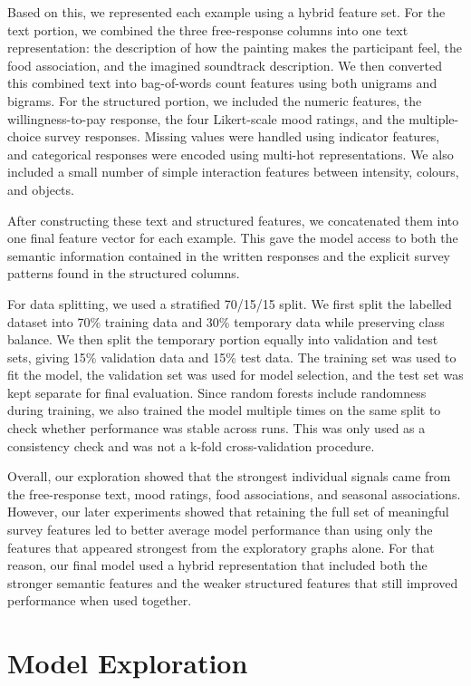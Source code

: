 \documentclass[12pt]{article}
\begin{document}
Based on this, we represented each example using a hybrid feature set. For the text portion, we combined the three free-response columns into one text representation: the description of how the painting makes the participant feel, the food association, and the imagined soundtrack description. We then converted this combined text into bag-of-words count features using both unigrams and bigrams. For the structured portion, we included the numeric features, the willingness-to-pay response, the four Likert-scale mood ratings, and the multiple-choice survey responses. Missing values were handled using indicator features, and categorical responses were encoded using multi-hot representations. We also included a small number of simple interaction features between intensity, colours, and objects.

After constructing these text and structured features, we concatenated them into one final feature vector for each example. This gave the model access to both the semantic information contained in the written responses and the explicit survey patterns found in the structured columns.

For data splitting, we used a stratified 70/15/15 split. We first split the labelled dataset into 70\% training data and 30\% temporary data while preserving class balance. We then split the temporary portion equally into validation and test sets, giving 15\% validation data and 15\% test data. The training set was used to fit the model, the validation set was used for model selection, and the test set was kept separate for final evaluation. Since random forests include randomness during training, we also trained the model multiple times on the same split to check whether performance was stable across runs. This was only used as a consistency check and was not a k-fold cross-validation procedure.

Overall, our exploration showed that the strongest individual signals came from the free-response text, mood ratings, food associations, and seasonal associations. However, our later experiments showed that retaining the full set of meaningful survey features led to better average model performance than using only the features that appeared strongest from the exploratory graphs alone. For that reason, our final model used a hybrid representation that included both the stronger semantic features and the weaker structured features that still improved performance when used together.

\section{Model Exploration}
\end{document}
